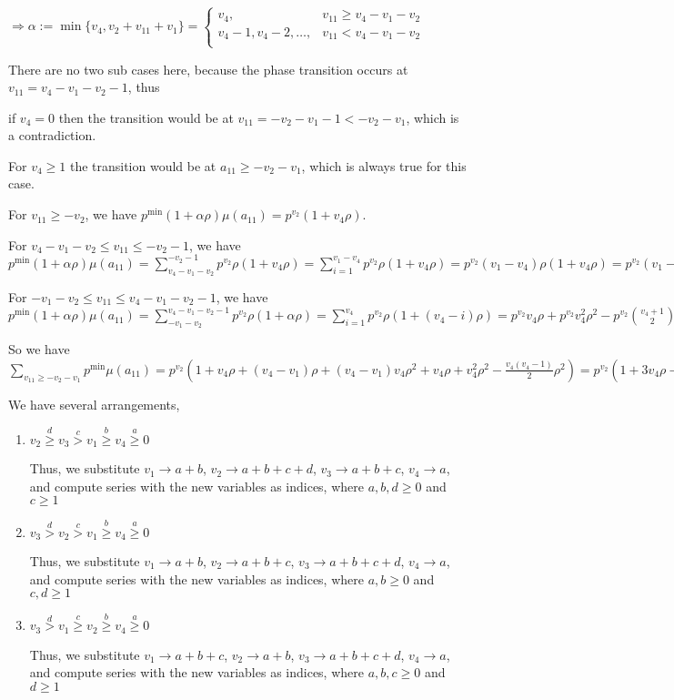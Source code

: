 \documentclass{article}
\begin{document}
$\Rightarrow\alpha:=\min\{v_4,v_2+v_{11}+v_1\}=\begin{cases}
       v_4, & v_{11}\geq{v_4-v_1-v_2}\\
       v_4-1,v_4-2,\dots, & v_{11}<{v_4-v_1-v_2}\\
     \end{cases}$

There are no two sub cases here, because the phase transition occurs at $v_{11}={v_4-v_1-v_2-1}$, thus 

if $v_4=0$ then the transition would be at $v_{11}=-v_2-v_1-1<-v_2-v_1$, which is a contradiction. 

For $v_4\geq{1}$ the transition would be at $a_{11}\geq{-v_2-v_1}$, which is always true for this case.

For $v_{11}\geq{-v_2}$, we have $p^{\min}(1+\alpha\rho)\mu(a_{11})=p^{v_2}(1+v_4\rho).$

For $v_4-v_1-v_2\leq{v_{11}}\leq{-v_2-1}$, we have $p^{\min}(1+\alpha\rho)\mu(a_{11})=\sum_{v_4-v_1-v_2}^{-v_2-1}p^{v_2}\rho(1+v_4\rho)=\sum_{i=1}^{v_1-v_4}p^{v_2}\rho(1+v_4\rho)=p^{v_2}(v_1-v_4)\rho(1+v_4\rho)=p^{v_2}(v_1-v_4)\rho+p^{v_2}(v_1-v_4)v_4\rho^2.$

For $-v_1-v_2\leq{v_{11}}\leq{v_4-v_1-v_2-1}$, we have $p^{\min}(1+\alpha\rho)\mu(a_{11})=\sum_{-v_1-v_2}^{v_4-v_1-v_2-1}p^{v_2}\rho(1+\alpha\rho)=\sum_{i=1}^{v_4}p^{v_2}\rho(1+(v_4-i)\rho)=p^{v_2}v_4\rho+p^{v_2}v_4^2\rho^2-p^{v_2}\binom{v_4+1}{2}\rho^2.$

So we have $\sum_{v_{11}\geq{-v_2-v_1}}p^{\min}\mu(a_{11})=p^{v_2}(1+v_4\rho+(v_4-v_1)\rho+(v_4-v_1)v_4\rho^2+v_4\rho+v_4^2\rho^2-\frac{v_4(v_4-1)}{2}\rho^2)=p^{v_2}(1+3v_4\rho-v_1\rho+2v_4^2\rho^2-v_1v_4\rho^2-\frac{v_4^2}{2}\rho^2+\frac{v_4}{2}\rho^2)$

We have several arrangements,
\begin{enumerate}
    \item 
$v_2\overset{d}{\geq}v_3\overset{c}{>}v_1\overset{b}{\geq}{v_4}\overset{a}{\geq}{0}$

Thus, we substitute $v_1\rightarrow{a+b}$, $v_2\rightarrow{a+b+c+d}$, $v_3\rightarrow{a+b+c}$, $v_4\rightarrow{a}$, and compute series with the new variables as indices, where $a,b,d\geq{0}$ and $c\geq{1}$    
\item 
$v_3\overset{d}{>}v_2\overset{c}{>}v_1\overset{b}{\geq}{v_4}\overset{a}{\geq}{0}$

Thus, we substitute $v_1\rightarrow{a+b}$, $v_2\rightarrow{a+b+c}$, $v_3\rightarrow{a+b+c+d}$, $v_4\rightarrow{a}$, and compute series with the new variables as indices, where $a,b\geq{0}$ and $c,d\geq{1}$
    \item 
$v_3\overset{d}{>}v_1\overset{c}{\geq}v_2\overset{b}{\geq}{v_4}\overset{a}{\geq}{0}$

Thus, we substitute $v_1\rightarrow{a+b+c}$, $v_2\rightarrow{a+b}$, $v_3\rightarrow{a+b+c+d}$, $v_4\rightarrow{a}$, and compute series with the new variables as indices, where $a,b,c\geq{0}$ and $d\geq{1}$

\end{enumerate}
\end{document}

